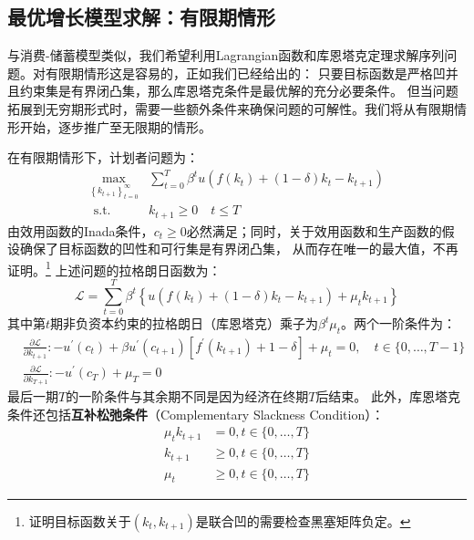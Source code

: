 \subsection{最优增长模型求解：有限期情形} \label{subsec-rck-finite}

与消费-储蓄模型类似，我们希望利用Lagrangian函数和库恩塔克定理求解序列问题。对有限期情形这是容易的，正如我们已经给出的：
只要目标函数是严格凹并且约束集是有界闭凸集，那么库恩塔克条件是最优解的充分必要条件。
但当问题拓展到无穷期形式时，需要一些额外条件来确保问题的可解性。我们将从有限期情形开始，逐步推广至无限期的情形。

在有限期情形下，计划者问题为：
\begin{equation*}
    \begin{aligned}
        \max_{\left\{k_{t+1}\right\}_{t=0}^{\infty}} & \sum_{t=0}^T \beta^t 
            u\left(f\left(k_t\right)+\left(1-\delta\right)k_t-k_{t+1}\right)    \\
        \text { s.t. } & k_{t+1} \geq 0 \quad t \leq T
    \end{aligned}
\end{equation*}
由效用函数的Inada条件，$c_t\geq 0$必然满足；同时，关于效用函数和生产函数的假设确保了目标函数的凹性和可行集是有界闭凸集，
从而存在唯一的最大值，不再证明。\footnote{证明目标函数关于$(k_t,k_{t+1})$是联合凹的需要检查黑塞矩阵负定。}
上述问题的拉格朗日函数为：
\begin{equation*}
    \mathcal{L}
        = \sum_{t=0}^T \beta^t\left\{u\left(f\left(k_t\right)+(1-\delta) k_t-k_{t+1}\right)+\mu_t k_{t+1}\right\}
\end{equation*}
其中第$t$期非负资本约束的拉格朗日（库恩塔克）乘子为$\beta^t \mu_t$。两个一阶条件为：
\begin{align}
    & \frac{\partial \mathcal{L}}{\partial k_{t+1}}:
        -u^{\prime}\left(c_t\right)+\beta u^{\prime}\left(c_{t+1}\right)
        \left[f^{\prime}\left(k_{t+1}\right)+1-\delta\right]+\mu_t=0, \quad t \in\{0, \ldots, T-1\} 
        \label{eq-rck-foc-before-terminal}  \\
    & \frac{\partial \mathcal{L}}{\partial k_{T+1}}:
        -u^{\prime}\left(c_T\right)+\mu_T = 0   \label{eq-rck-foc-terminal}
\end{align}
最后一期$T$的一阶条件与其余期不同是因为经济在终期$T$后结束。
此外，库恩塔克条件还包括\textbf{互补松弛条件}（Complementary Slackness Condition）：
\begin{equation}
    \begin{aligned}
        \mu_t k_{t+1} & =0, t \in\{0, \ldots, T\} \\
        k_{t+1} & \geq 0, t \in\{0, \ldots, T\} \\
        \mu_t & \geq 0, t \in\{0, \ldots, T\} 
    \end{aligned}
\end{equation}
